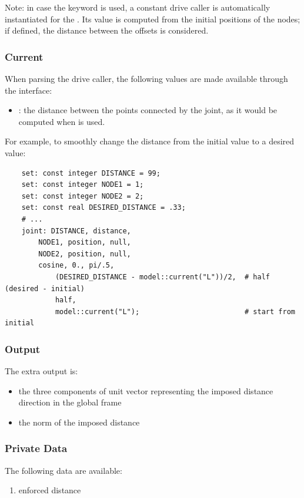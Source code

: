 Note: in case the keyword  is used, a constant drive
caller is automatically instantiated for the . 
Its value is computed from the initial positions of the nodes;
if defined, the distance between the offsets is considered. 



\subsubsection{Current}
When parsing the drive caller, the following values are made available
through the  interface:
\begin{itemize}
\item
{}: 
the distance between the points connected by the joint,
as it would be computed when  is used.
\end{itemize}
For example, to smoothly change the distance from the initial value to a desired value:
\begin{verbatim}
    set: const integer DISTANCE = 99;
    set: const integer NODE1 = 1;
    set: const integer NODE2 = 2;
    set: const real DESIRED_DISTANCE = .33;
    # ...
    joint: DISTANCE, distance,
        NODE1, position, null,
        NODE2, position, null,
        cosine, 0., pi/.5,
            (DESIRED_DISTANCE - model::current("L"))/2,  # half (desired - initial)
            half,
            model::current("L");                         # start from initial
\end{verbatim}



\subsubsection{Output}
The extra output is:
\begin{itemize}
    \item the three components of unit vector representing the imposed 
      distance direction in the global frame
    \item the norm of the imposed distance
\end{itemize}

\subsubsection{Private Data}
The following data are available:
\begin{enumerate}
\item {} enforced distance
\end{enumerate}

